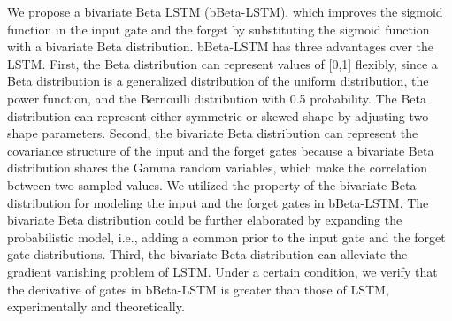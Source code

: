 \documentclass[letterpaper]{article} %
\begin{document}
We propose a bivariate Beta LSTM (bBeta-LSTM), which improves the sigmoid function in the input gate and the forget by substituting the sigmoid function with a bivariate Beta distribution. bBeta-LSTM has three advantages over the LSTM. First, the Beta distribution can represent values of [0,1] flexibly, since a Beta distribution is a generalized distribution of the uniform distribution, the power function, and the Bernoulli distribution with 0.5 probability. The Beta distribution can represent either symmetric or skewed shape by adjusting two shape parameters.
Second, the bivariate Beta distribution can represent the covariance structure of the input and the forget gates because a bivariate Beta distribution shares the Gamma random variables, which make the correlation between two sampled values. We utilized the property of the bivariate Beta distribution for modeling the input and the forget gates in bBeta-LSTM. 
The bivariate Beta distribution could be further elaborated by expanding the probabilistic model, i.e., adding a common prior to the input gate and the forget gate distributions. 
Third, the bivariate Beta distribution can alleviate the gradient vanishing problem of LSTM. Under a certain condition, we verify that the derivative of gates in bBeta-LSTM is greater than those of LSTM, experimentally and theoretically. 
\end{document}
